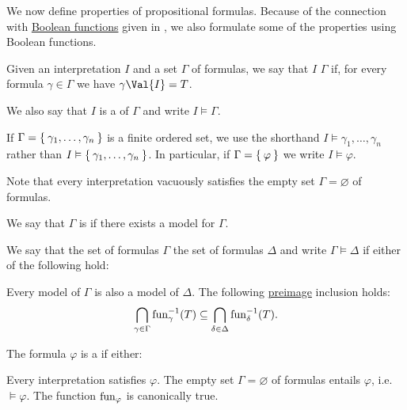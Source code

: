 \begin{definition}\label{def:propositional_semantics}
  We now define  properties of propositional formulas. Because of the connection with \hyperref[def:boolean_function]{Boolean functions} given in , we also formulate some of the properties using Boolean functions.

  \begin{DefEnum}
     Given an interpretation \( I \) and a set \( \Gamma \) of formulas, we say that \( I \)  \( \Gamma \) if, for every formula \( \gamma \in \Gamma \) we have \( \gamma\Val{I} = T \).

    We also say that \( I \) is a  of \( \Gamma \) and write \( I \vDash \Gamma \).

    If \( \Gamma = \Set{ \gamma_1, \ldots, \gamma_n } \) is a finite ordered set, we use the shorthand \( I \vDash \gamma_1, \ldots, \gamma_n \) rather than \( I \vDash \Set{ \gamma_1, \ldots, \gamma_n } \). In particular, if \( \Gamma = \Set{ \varphi } \) we write \( I \vDash \varphi \).

    Note that every interpretation vacuously satisfies the empty set \( \Gamma = \varnothing \) of formulas.

    We say that \( \Gamma \) is  if there exists a model for \( \Gamma \).

     We say that the set of formulas \( \Gamma \)  the set of formulas \( \Delta \) and write \( \Gamma \vDash \Delta \) if either of the following hold:
    \begin{itemize}
       Every model of \( \Gamma \) is also a model of \( \Delta \).
       The following \hyperref[def:function/preimage]{preimage} inclusion holds:
      \begin{equation*}
        \bigcap_{\gamma \in \Gamma} \operatorname{fun}_\gamma^{-1}(T) \subseteq \bigcap_{\delta \in \Delta} \operatorname{fun}_\delta^{-1}(T).
      \end{equation*}
    \end{itemize}

     The formula \( \varphi \) is a  if either:
    \begin{itemize}
       Every interpretation satisfies \( \varphi \).
       The empty set \( \Gamma = \varnothing \) of formulas entails \( \varphi \), i.e. \( \vDash \varphi \).
       The function \( \operatorname{fun}_\varphi \) is canonically true.
    \end{itemize}


\end{DefEnum}
\end{definition}

